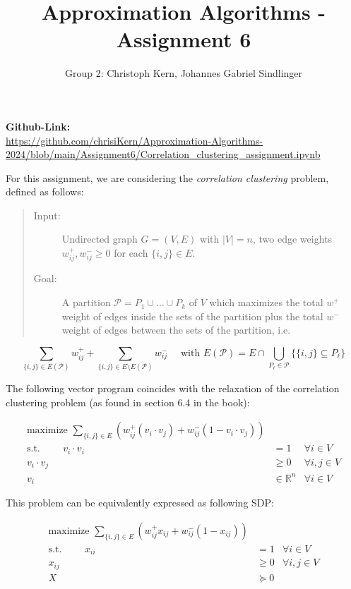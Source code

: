 \documentclass{article}
\title{Approximation Algorithms - Assignment 6}
\author{Group 2: Christoph Kern, Johannes Gabriel Sindlinger}
\begin{document}
\maketitle

\begin{center}
    \textbf{Github-Link:} \\
\url{https://github.com/chrisiKern/Approximation-Algorithms-2024/blob/main/Assignment6/Correlation_clustering_assignment.ipynb}
\end{center}

For this assignment, we are considering the \emph{correlation clustering} problem, defined as follows:
\begin{quote}
    \begin{description}
        \item[Input:] Undirected graph $G=(V,E)$ with $|V| = n$, two edge weights $w_{ij}^+, w_{ij}^- \ge 0$ for each  $\{i,j\} \in E$.
        \item[Goal:] A partition $\mathcal{P} = P_1 \cup \dots \cup P_k$ of $V$ which maximizes the total $w^+$ weight of edges inside the sets of the partition plus the total $w^-$ weight of edges between the sets of the partition, i.e.
    \end{description}
\end{quote}
 \[
    \sum_{\{i,j\} \in E(\mathcal{P})} w_{ij}^+ + \sum_{\{i,j\} \in E \setminus E(\mathcal{P})} w_{ij}^- \quad \text{ with } E(\mathcal{P}) = E \cap \bigcup\limits_{P_\ell \in \mathcal{P}} \{\{i,j\} \subseteq P_\ell \}
\]
\vspace{1em}

The following vector program coincides with the relaxation of the correlation clustering problem (as found in section 6.4 in the book):

\begin{align*}
    \text{maximize }\sum_{\{i,j\} \in E} \left(w_{ij}^+(v_i\cdot v_j) + w_{ij}^-(1-v_i\cdot v_j) \right)\\
    \text{s.t. }\quad\quad v_i\cdot v_i &= 1 & \forall i \in V\\
    v_i\cdot v_j &\ge 0 & \forall i,j \in V\\
    v_i &\in \mathbb{R}^n & \forall i \in V
\end{align*}

This problem can be equivalently expressed as following SDP:

\begin{align*}
    \text{maximize }\sum_{\{i,j\} \in E} \left(w_{ij}^+x_{ij} + w_{ij}^-(1-x_{ij}) \right)\\
    \text{s.t. }\quad\quad x_{ii} &= 1 & \forall i \in V\\
    x_{ij} &\ge 0 & \forall i,j \in V\\
    X &\succeq 0
\end{align*}
\end{document}
